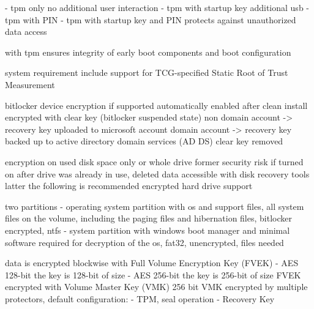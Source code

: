 - tpm only
no additional user interaction
- tpm with startup key
additional usb
- tpm with PIN
- tpm with startup key and PIN
protects against unauthorized data access
\cite{microsoft-bitlocker-countermeasures}

with tpm ensures integrity of early boot components and boot configuration


system requirement
include support for TCG-specified Static Root of Trust Measurement

\cite{microsoft-bitlocker-device-encryption}

bitlocker device encryption if supported automatically enabled
after clean install encrypted with clear key (bitlocker suspended state)
non domain account -> recovery key uploaded to microsoft account
domain account -> recovery key backed up to active directory domain services (AD DS)
clear key removed

encryption on used disk space only or whole drive
former security risk if turned on after drive was already in use, deleted data accessible with disk recovery tools
latter the following is recommended
encrypted hard drive support

two partitions
- operating system partition with os and support files, all system files on the volume, including the paging files and hibernation files, bitlocker encrypted, ntfs
- system partition with windows boot manager and minimal software required for decryption of the os, fat32, unencrypted, files needed

data is encrypted blockwise with Full Volume Encryption Key (FVEK)
- AES 128-bit the key is 128-bit of size
- AES 256-bit the key is 256-bit of size
FVEK encrypted with Volume Master Key (VMK) 256 bit
VMK encrypted by multiple protectors, default configuration:
- TPM, seal operation
- Recovery Key

